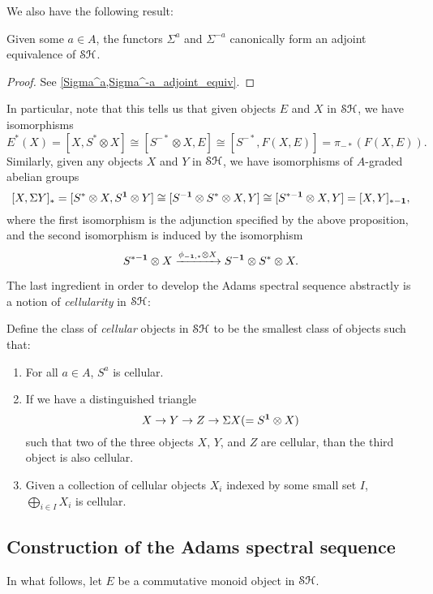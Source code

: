 \documentclass[../main.tex]{subfiles}
\begin{document}
We also have the following result:

\begin{proposition}
	Given some $a\in A$, the functors $\Sigma^a$ and $\Sigma^{-a}$ canonically form an adjoint equivalence of $\mathcal{SH}$.
\end{proposition}
\begin{proof}
	See \autoref{Sigma^a,Sigma^-a_adjoint_equiv}.
\end{proof}

In particular, note that this tells us that given objects $E$ and $X$ in $\mathcal{SH}$, we have isomorphisms
\[E^\ast(X)=[X,S^*\otimes X]\cong[S^{-\ast}\otimes X,E]\cong[S^{-*},F(X,E)]=\pi_{-*}(F(X,E)).\]
Similarly, given any objects $X$ and $Y$ in $\mathcal{SH}$, we have isomorphisms of $A$-graded abelian groups
\[[X,\Sigma Y]_*=[S^*\otimes X,S^{\mathbf{1}}\otimes Y]\cong[S^{-\mathbf{1}}\otimes S^\ast\otimes X,Y]\cong[S^{*-\mathbf{1}}\otimes X,Y]=[X,Y]_{*-\mathbf{1}},\]
where the first isomorphism is the adjunction specified by the above proposition, and the second isomorphism is induced by the isomorphism
\[S^{*-\mathbf{1}}\otimes X\xrightarrow{\phi_{-\mathbf{1},\ast}\otimes X}S^{-\mathbf{1}}\otimes S^*\otimes X.\]

The last ingredient in order to develop the Adams spectral sequence abstractly is a notion of \emph{cellularity} in $\mathcal{SH}$:

\begin{definition}\label{cellular}
	Define the class of \emph{cellular} objects in $\mathcal{SH}$ to be the smallest class of objects such that:
	\begin{enumerate}
		\item For all $a\in A$, $S^a$ is cellular.
		\item If we have a distinguished triangle
		\[X\to Y\to Z\to\Sigma X(=S^{\mathbf{1}}\otimes X)\]
		such that two of the three objects $X$, $Y$, and $Z$ are cellular, than the third object is also cellular.
		\item Given a collection of cellular objects $X_i$ indexed by some small set $I$, $\bigoplus_{i\in I} X_i$ is cellular.
	\end{enumerate}
\end{definition}

\subsection{Construction of the Adams spectral sequence}

In what follows, let $E$ be a commutative monoid object in $\mathcal{SH}$.
\end{document}
